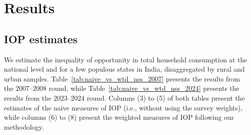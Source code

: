 \documentclass[12pt]{article}
\theoremstyle{plain}
\theoremstyle{definition}
\begin{document}
\begin{table}[h]
    \centering\small
    \caption{Summary statistics for Indian NSS 2007--2008 total household expenditure}
        
    \label{tab:summary_stats_nss_2007}
\end{table}

\begin{table}[h]
    \centering
    \caption{Summary statistics for Indian NSS 2023--2024 total household expenditure}
        
    \label{tab:summary_stats_nss_2024}
\end{table}


\section{Results}
\label{sec:Results}

\subsection{IOP estimates}
\label{ssec:iop_est}

We estimate the inequality of opportunity in total household consumption at the national level and for a few populous states in India, disaggregated by rural and urban samples. 
Table~\ref{tab:naive_vs_wtd_nss_2007} presents the results from the 2007--2008 round, while Table~\ref{tab:naive_vs_wtd_nss_2024} presents the results from the 2023--2024 round. Columns (3) to (5) of both tables present the estimates of the naive measures of IOP (i.e., without using the survey weights), while columns (6) to (8) present the weighted measures of IOP following our methodology. 

\begin{table}
    \centering\small
    \caption{Unweighted and weighted estimates of relative IOP for total household expenditure due to circumstances for NSS 2007--2008}
        
    \label{tab:naive_vs_wtd_nss_2007}
\end{table}

\begin{table}
    \centering\small
    \caption{Unweighted and weighted estimates of relative IOP for total household expenditure due to circumstances for NSS 2023--2024}
      
    \label{tab:naive_vs_wtd_nss_2024}
\end{table}
\end{document}
